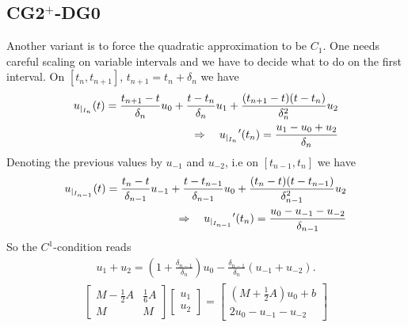 \documentclass[english,12pt,a4paper]{article}
\begin{document}
\subsection{CG2$^+$-DG0}\label{subsec:}
%
Another variant is to force the quadratic approximation to be $C_1$. One needs careful scaling on variable intervals and we have to decide what to do on the first interval.
On $[t_n, t_{n+1}]$, $t_{n+1}= t_n+\delta_n$ we have
%
\begin{align*}
{u}_{|_{I_n}}(t) = \frac{t_{n+1}-t}{\delta_n}u_0 + \frac{t-t_n}{\delta_n} u_1 + \frac{(t_{n+1}-t)(t-t_n)}{\delta_n^2} u_2 \\\quad\Rightarrow\quad 
{{u}_{|_{I_n}}}'(t_n) = \frac{u_1-u_0 + u_2}{\delta_n} 
\end{align*}
%
Denoting the previous values by $u_{-1}$ and $u_{-2}$, i.e on $[t_{n-1}, t_n]$ we have 
%
\begin{align*}
{u}_{|_{I_{n-1}}}(t) = \frac{t_n-t}{\delta_{n-1}}u_{-1} + \frac{t-t_{n-1}}{\delta_{n-1}} u_0 + \frac{(t_{n}-t)(t-t_{n-1})}{\delta_{n-1}^2} u_2 \\\quad\Rightarrow\quad 
{{u}_{|_{I_{n-1}}}}'(t_n) = \frac{u_0-u_{-1}-u_{-2}}{\delta_{n-1}} 
\end{align*}
%
So the $C^1$-condition reads
%
\begin{align*}
 u_1  + u_2 = \left(1+\frac{\delta_{n-1}}{\delta_n}\right)u_0 -\frac{\delta_{n-1}}{\delta_n}\left( u_{-1}+u_{-2}\right).
\end{align*}
%
%
\begin{align*}
\begin{bmatrix}
M - \frac12 A & \frac16 A\\
M & M
\end{bmatrix}
\begin{bmatrix}
u_1 \\ u_2
\end{bmatrix}
=
\begin{bmatrix}
(M + \frac12 A) u_0 + b \\ 2 u_0 - u_{-1} - u_{-2}
\end{bmatrix}
\end{align*}
%
\end{document}
